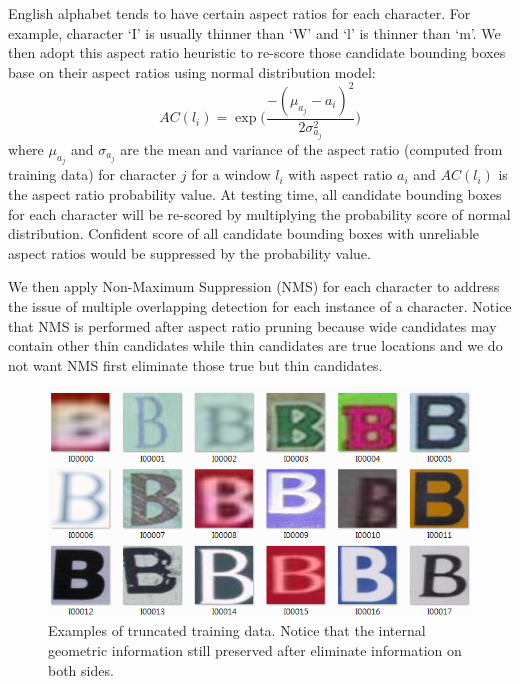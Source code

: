 \documentclass[10pt,twocolumn,letterpaper]{article}
\begin{document}
English alphabet tends to have certain aspect ratios for each character. For example, character `I' is usually thinner than `W' and `l' is thinner than `m'. We then adopt this aspect ratio heuristic to re-score those candidate bounding boxes base on their aspect ratios using normal distribution model:
\[
AC(l_i) = \exp \Bigg( \frac{-(\mu_{a_j} - a_i)^2}{2\sigma_{a_j}^2} \Bigg)
\]
where $\mu_{a_j}$ and $\sigma_{a_j}$ are the mean and variance of the aspect ratio (computed from training data) for character $j$ for a window $l_i$ with aspect ratio $a_i$ and $AC(l_i)$ is the aspect ratio probability value. At testing time, all candidate bounding boxes for each character will be re-scored by multiplying the probability score of normal distribution. Confident score of all candidate bounding boxes with unreliable aspect ratios would be suppressed by the probability value.

We then apply Non-Maximum Suppression (NMS) for each character to address the issue of multiple overlapping detection for each instance of a character. Notice that NMS is performed after aspect ratio pruning because wide candidates may contain other thin candidates while thin candidates are true locations and we do not want NMS first eliminate those true but thin candidates.

\begin{figure}[t]
\begin{center}
\includegraphics[width=1\linewidth]{fig/train_data}
\end{center}
   \caption{Examples of truncated training data. Notice that the internal geometric information still preserved after eliminate information on both sides.}
\label{fig:sample1}
\end{figure}
\end{document}
